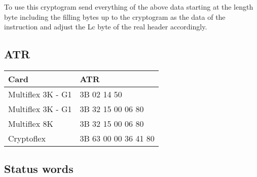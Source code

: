 \documentclass[a4paper,oneside]{article}
\begin{document}
To use this cryptogram send everything of the above data starting
at the length byte including the filling bytes up to the cryptogram
as the data of the instruction and adjust the Lc byte of the real
header accordingly.

\subsection{ATR}

\begin{center}
\begin{tabular}{|l|l|} \hline
Card & ATR \\ \hline \hline
Multiflex 3K - G1 & 3B 02 14 50 \\ \hline
Multiflex 3K - G1 & 3B 32 15 00 06 80 \\ \hline
Multiflex 8K & 3B 32 15 00 06 80 \\ \hline
Cryptoflex & 3B 63 00 00 36 41 80 \\ \hline
\end{tabular}
\end{center}

\subsection{Status words}
\end{document}
